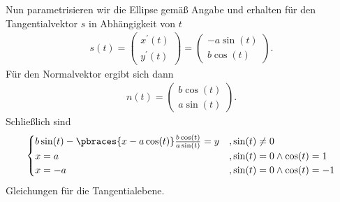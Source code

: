 \begin{solution}
Nun parametrisieren wir die Ellipse gemäß Angabe und erhalten für den Tangentialvektor $s$ in Abhängigkeit von $t$
\begin{align*}
  s(t) = 
  \begin{pmatrix}
    x^\prime(t) \\ y^\prime(t)
  \end{pmatrix} =
  \begin{pmatrix}
    -a \sin(t) \\ b \cos(t)
  \end{pmatrix} .
\end{align*}
Für den Normalvektor ergibt sich dann 
\begin{align*}
  n(t) = 
  \begin{pmatrix}
    b \cos(t) \\ a \sin(t)
  \end{pmatrix} .
\end{align*}
Schließlich sind
\begin{align*}
  \begin{cases}
    b \sin(t) - \pbraces{ x - a \cos(t) } \frac{b \cos(t)}{a \sin(t)} = y & ,\sin(t) \neq 0 \\
    x = a & , \sin(t) = 0 \land \cos(t) = 1 \\
    x = -a & , \sin(t) = 0 \land \cos(t) = -1
  \end{cases}
\end{align*}
Gleichungen für die Tangentialebene.
\end{solution}
